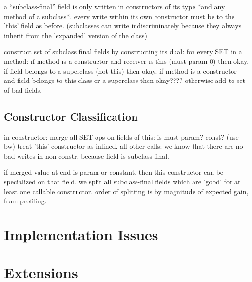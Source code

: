 \documentclass[preprint]{acmconf}
\begin{document}
a ``subclass-final'' field is only written in constructors of its type
*and any method of a subclass*.  every write within its own
constructor must be to the 'this' field as before.  (subclasses
can write indiscriminately because they always inherit from the 'expanded'
version of the class)

construct set of subclass final fields by constructing its dual:
for every SET in a method: if method is a constructor and receiver
is this (must-param 0) then okay.  if field belongs to a superclass
(not this) then okay.  if method is a constructor and field belongs
to this class or a superclass then okay????  otherwise add to set
of bad fields.

\subsection{Constructor Classification}

in constructor:
  merge all SET ops on fields of this: is must param?  const? (use bw)
  treat 'this' constructor as inlined.
  all other calls: we know that there are no bad writes in non-constr,
   because field is subclass-final.

if merged value at end is param or constant, then this constructor
can be specialized on that field.  we split all subclass-final fields
which are 'good' for at least one callable constructor.  order of
splitting is by magnitude of expected gain, from profiling.

\section{Implementation Issues}


\section{Extensions} %
\end{document}
